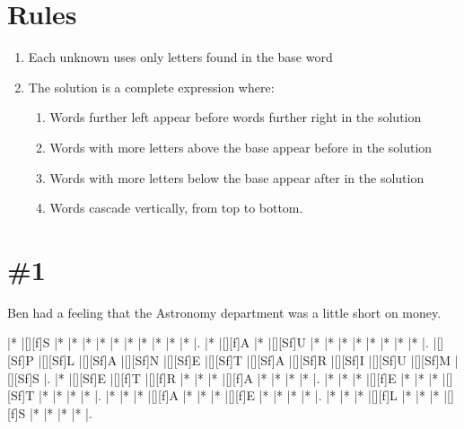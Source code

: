 \documentclass[letterpaper]{article}
\begin{document}
\vspace*{-4cm}
\section*{Rules}

\begin{enumerate}
    \item Each unknown uses only letters found in the base word
    \item The solution is a complete expression where:
    \begin{enumerate}
        \item Words further left appear before words further right in the solution
        \item Words with more letters above the base appear before in the solution
        \item Words with more letters below the base appear after in the solution
        \item Words cascade vertically, from top to bottom.
    \end{enumerate}
\end{enumerate}

\section*{\#1}
Ben had a feeling that the Astronomy department was a little short on money.
\vspace*{1em}
\begin{Puzzle}{12}{8}
|*        |[][f]S   |*        |*        |*        |*        |*        |*        |*        |*        |*        |*        |.
|*        |[][f]A   |*        |[][Sf]U  |*        |*        |*        |*        |*        |*        |*        |*        |.
|[][Sf]P  |[][Sf]L  |[][Sf]A  |[][Sf]N  |[][Sf]E  |[][Sf]T  |[][Sf]A  |[][Sf]R  |[][Sf]I  |[][Sf]U  |[][Sf]M  |[][Sf]S  |.
|*        |[][Sf]E  |[][f]T   |[][f]R   |*        |*        |*        |[][f]A   |*        |*        |*        |*        |.
|*        |*        |*        |[][f]E   |*        |*        |*        |[][Sf]T  |*        |*        |*        |*        |.
|*        |*        |*        |[][f]A   |*        |*        |*        |[][f]E   |*        |*        |*        |*        |.
|*        |*        |*        |[][f]L   |*        |*        |*        |[][f]S   |*        |*        |*        |*        |.
\end{Puzzle}

\end{document}
